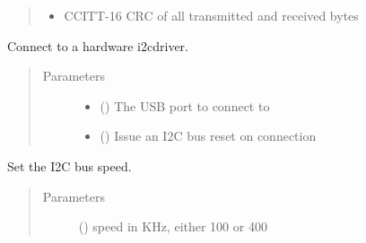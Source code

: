 \begin{fulllineitems}
\begin{quote}
\begin{description}
\begin{itemize}
\item {} 
 \textendash{} CCITT-16 CRC of all transmitted and received bytes

\end{itemize}

\end{description}\end{quote}

\begin{fulllineitems}
\label{\detokenize{index:i2cdriver.I2CDriver.__init__}}
Connect to a hardware i2cdriver.
\begin{quote}\begin{description}
\item[{Parameters}] \leavevmode\begin{itemize}
\item {} 
 () \textendash{} The USB port to connect to

\item {} 
 () \textendash{} Issue an I2C bus reset on connection

\end{itemize}

\end{description}\end{quote}

\end{fulllineitems}


\begin{fulllineitems}
\label{\detokenize{index:i2cdriver.I2CDriver.setspeed}}
Set the I2C bus speed.
\begin{quote}\begin{description}
\item[{Parameters}] \leavevmode
{} () \textendash{} speed in KHz, either 100 or 400


\end{description}
\end{quote}
\end{fulllineitems}
\end{fulllineitems}
